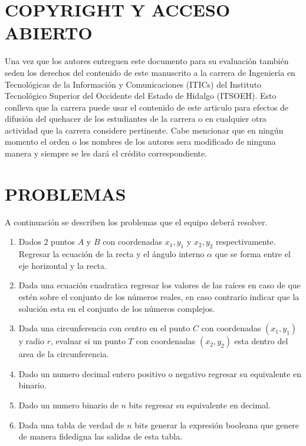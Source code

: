 \documentclass{IEEEcsmag}
\begin{document}
\section{COPYRIGHT Y ACCESO ABIERTO}

Una vez que los autores entreguen este documento para su evaluación también seden los derechos del contenido de este manuscrito a la carrera de Ingeniería en Tecnológicas de la Información y Comunicaciones (ITICs) del Instituto Tecnológico Superior del Occidente del Estado de Hidalgo (ITSOEH). Esto conlleva que la carrera puede usar el contenido de este articulo para efectos de difusión del quehacer de los estudiantes de la carrera o en cualquier otra actividad que la carrera considere pertinente. Cabe mencionar que en ningún momento el orden o los nombres de los autores sera modificado de ninguna manera y siempre se les dará el crédito correspondiente. 
\section{PROBLEMAS}
A continuación se describen los problemas que el equipo deberá resolver.
\begin{enumerate}
\item Dados 2 puntos $A \mbox{ y } B$ con coordenadas $x_{1}, y_{1}$ y $x_{2}, y_{2}$  respectivamente. Regresar la ecuación de la recta y el ángulo interno $\alpha$ que se forma entre el eje horizontal y la recta. 
\item Dada una ecuación cuadratica regresar los valores de las raíces en caso de que estén sobre el conjunto de los números reales, en caso contrario indicar que la solución esta en el conjunto de los números complejos. 
\item Dada una circunferencia con centro en el punto $C$ con coordenadas $(x_{1}, y_{1})$ y radio $r$, evaluar si un punto $T$ con coordenadas $(x_{2}, y_{2})$ esta dentro del area de la circunferencia.
\item Dado un numero decimal entero positivo o negativo regresar su equivalente en binario.
\item Dado un numero binario de $n$ bits regresar su equivalente en decimal.
\item Dada una tabla de verdad de $n$ bits generar la expresión booleana que genere de manera fidedigna las salidas de esta tabla.
\end{enumerate}
\end{document}
